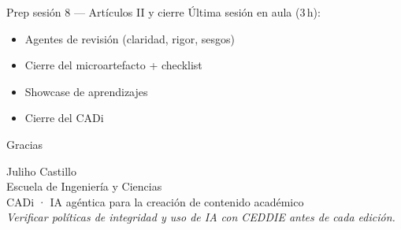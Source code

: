 \documentclass[aspectratio=169,11pt]{beamer}
\begin{document}
\begin{frame}{Prep sesión 8 --- Artículos II y cierre}
Última sesión en aula (3\,h):
\begin{itemize}
\item Agentes de revisión (claridad, rigor, sesgos)
\item Cierre del microartefacto + checklist
\item Showcase de aprendizajes
\item Cierre del CADi
\end{itemize}
\end{frame}

\begin{frame}{Gracias}
\begin{center}
{\Large Juliho Castillo}\\[0.5em]
Escuela de Ingeniería y Ciencias\\[1em]
CADi · IA agéntica para la creación de contenido académico\\[1.5em]
{\small \emph{Verificar políticas de integridad y uso de IA con CEDDIE antes de cada edición.}}
\end{center}
\end{frame}
\end{document}

